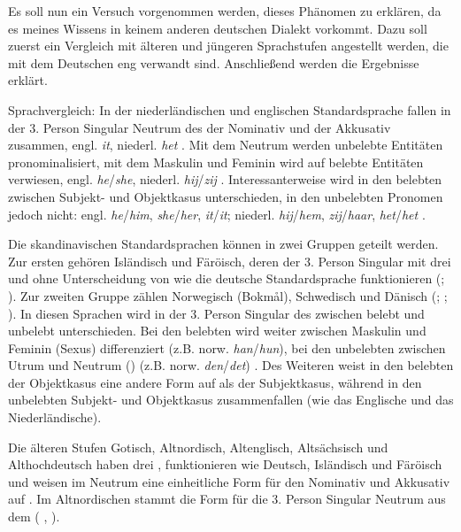 Es soll nun ein Versuch vorgenommen werden, dieses Phänomen zu erklären, da es meines Wissens in keinem anderen deutschen Dialekt vorkommt. Dazu soll zuerst ein Vergleich mit älteren und jüngeren Sprachstufen angestellt werden, die mit dem Deutschen eng verwandt sind. Anschließend werden die Ergebnisse erklärt.

{Sprachvergleich}: In der niederländischen und englischen Standardsprache fallen in der 3. Person Singular Neutrum des  der Nominativ und der Akkusativ zusammen, engl. \textit{it}, niederl. \textit{het} \citep[36]{GabrielRoodzant2010}. Mit dem Neutrum werden unbelebte Entitäten pronominalisiert, mit dem Maskulin und Feminin wird auf belebte Entitäten verwiesen, engl. \textit{he}\slash\textit{she}, niederl. \textit{hij}\slash \textit{zij} \citep[36]{GabrielRoodzant2010}. Interessanterweise wird in den belebten  zwischen Subjekt- und Objektkasus unterschieden, in den unbelebten Pronomen jedoch nicht: engl. \textit{he}/\textit{him}, \textit{she}/\textit{her}, \textit{it}/\textit{it}; niederl. \textit{hij}/\textit{hem}, \textit{zij}/\textit{haar}, \textit{het}/\textit{het} \citep[36]{GabrielRoodzant2010}. 

Die skandinavischen Standardsprachen können in zwei Gruppen geteilt werden. Zur ersten gehören Isländisch und Färöisch, deren  der 3. Person Singular mit drei  und ohne Unterscheidung von  wie die deutsche Standardsprache funktionieren (\citealt[76]{Pétursson1981}; \citealt[200]{BarnesWeyhe2002}). Zur zweiten Gruppe zählen Norwegisch (Bokmål), Schwedisch und Dänisch (\citealt[317--332]{FaarlundLieVannebo1997}; \citealt[128--136]{HolmesHinchliffe1994}; \citealt[141-155]{AllanHomlmesLundskær-Nielsen1995}). In diesen Sprachen wird in der 3. Person Singular des  zwischen belebt und unbelebt unterschieden. Bei den belebten  wird weiter zwischen Maskulin und Feminin (Sexus) differenziert (z.B. norw. \textit{han}/\textit{hun}), bei den unbelebten  zwischen Utrum und Neutrum () (z.B. norw. \textit{den}/\textit{det}) \citep[317]{FaarlundLieVannebo1997}. Des Weiteren weist in den belebten  der Objektkasus eine andere Form auf als der Subjektkasus, während in den unbelebten  Subjekt- und Objektkasus zusammenfallen (wie das Englische und das Niederländische).

Die älteren Stufen Gotisch, Altnordisch, Altenglisch, Altsächsisch und Althochdeutsch haben drei , funktionieren wie Deutsch, Isländisch und Färöisch und weisen im Neutrum eine einheitliche Form für den Nominativ und Akkusativ auf \citep[54]{KraheMeid1967}. Im Altnordischen stammt die Form für die 3. Person Singular Neutrum aus dem  ( \citealt[54]{KraheMeid1967}, \citealt[108]{Gutenbrunner1951} ).

